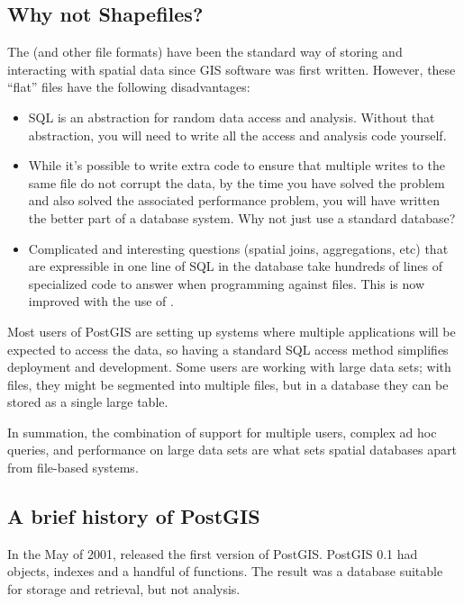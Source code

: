 \documentclass[a4paper,11pt,english]{sphinxmanual}
\begin{document}
\subsection{Why not Shapefiles?}
\label{\detokenize{introduction:why-not-shapefiles}}
The  (and other file formats) have been the standard way of storing and interacting with spatial data since GIS software was first written. However, these “flat” files have the following disadvantages:
\begin{itemize}
\item {} 
  SQL is an abstraction for random data access and analysis. Without that abstraction, you will need to write all the access and analysis code yourself.

\item {} 
 While it’s possible to write extra code to ensure that multiple writes to the same file do not corrupt the data, by the time you have solved the problem and also solved the associated performance problem, you will have written the better part of a database system. Why not just use a standard database?

\item {} 
 Complicated and interesting questions (spatial joins, aggregations, etc) that are expressible in one line of SQL in the database take hundreds of lines of specialized code to answer when programming against files. This is now improved with the use of .

\end{itemize}

Most users of PostGIS are setting up systems where multiple applications will be expected to access the data, so having a standard SQL access method simplifies deployment and development. Some users are working with large data sets; with files, they might be segmented into multiple files, but in a database they can be stored as a single large table.

In summation, the combination of support for multiple users, complex ad hoc queries, and performance on large data sets are what sets spatial databases apart from file-based systems.


\subsection{A brief history of PostGIS}
\label{\detokenize{introduction:a-brief-history-of-postgis}}
In the May of 2001,   released the first version of PostGIS. PostGIS 0.1 had objects, indexes and a handful of functions. The result was a database suitable for storage and retrieval, but not analysis.
\end{document}
